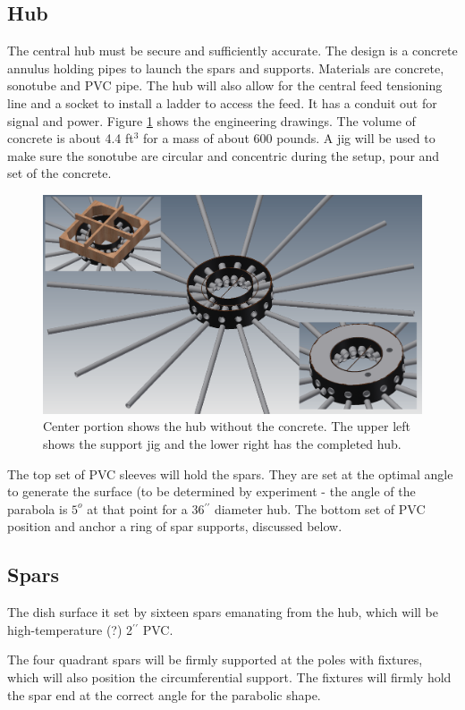 \documentclass[11pt]{article}
\newcommand{\inch}{$^{\prime\prime}$}
\begin{document}
\subsection{Hub}
The central hub must be secure and sufficiently accurate.  The design is a concrete annulus holding pipes to launch the spars and supports.  Materials are concrete, sonotube and PVC pipe. The hub will also allow for the central feed tensioning line and a socket to install a ladder to access the feed.  It has a conduit out for signal and power.  Figure \ref{fig:hub} shows the engineering drawings.  The volume of concrete is about 4.4 ft$^3$ for a mass of about 600 pounds.
A jig will be used to make sure the sonotube are circular and concentric during the setup, pour and set of the concrete.

\begin{figure}[H]
\centering
\includegraphics[width=\textwidth]{hub.png}
\caption{Center portion shows the hub without the concrete.  The upper left shows the support jig and the lower right has the completed hub.}
\label{fig:hub}
\end{figure}

The top set of PVC sleeves will hold the spars.  They are set at the optimal angle to generate the surface (to be determined by experiment - the angle of the parabola is $5^o$ at that point for a 36\inch{} diameter hub.  The bottom set of PVC position and anchor a ring of spar supports, discussed below.

\subsection{Spars}
The dish surface it set by sixteen spars emanating from the hub, which will be high-temperature (?) 2\inch{} PVC. 

The four quadrant spars will be firmly supported at the poles with fixtures, which will also position the circumferential support.  The fixtures will firmly hold the spar end at the correct angle for the parabolic shape.  
\end{document}
